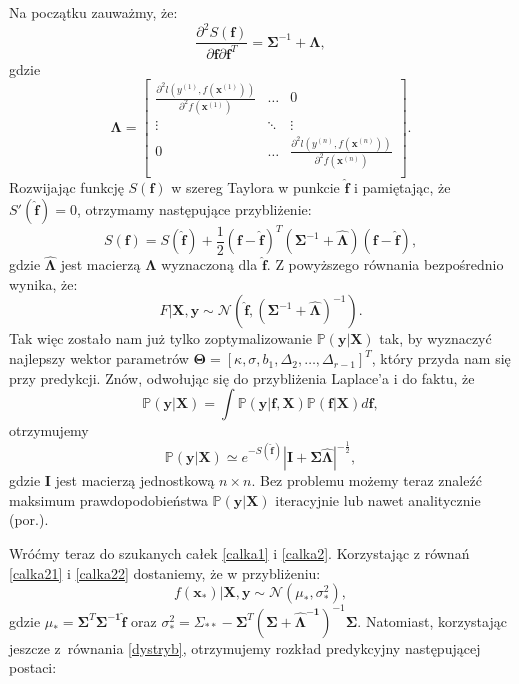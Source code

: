 \documentclass{mini}
\begin{document}
Na początku zauważmy, że:
$$
\frac{\partial^2 S(\mathbf{f})}{\partial \mathbf{f}\partial \mathbf{f}^T} = 
\mathbf{\Sigma}^{-1}+\mathbf{\Lambda},
$$
gdzie
$$
\mathbf{\Lambda} = 
	\left[
        \begin{array}{ccc}
         \frac{\partial^2\textit{l}(y^{(1)}, f(\mathbf{x}^{(1)}))}{\partial^2 f(\mathbf{x}^{(1)})} & \ldots & 0\\
         \vdots & \ddots & \vdots \\
         0 & \ldots & \frac{\partial^2\textit{l}(y^{(n)}, f(\mathbf{x}^{(n)}))}{\partial^2 f(\mathbf{x}^{(n)})} \\
        \end{array}
    \right]. 
$$
Rozwijając funkcję $S(\mathbf{f})$ w szereg Taylora w punkcie $\mathbf{\hat{f}}$ i pamiętając, że $S'(\mathbf{\hat{f}})=0$, otrzymamy następujące przybliżenie:
$$
S(\mathbf{f}) = S(\mathbf{\hat{f}}) + \frac{1}{2}(\mathbf{f} - \mathbf{\hat{f}})^T(\mathbf{\Sigma}^{-1}+\hat{\mathbf{\Lambda}})(\mathbf{f}-\mathbf{\hat{f}}),
$$
gdzie $\hat{\mathbf{\Lambda}}$ jest macierzą $\mathbf{\Lambda}$ wyznaczoną dla $\mathbf{\hat{f}}$. Z powyższego równania bezpośrednio wynika, że:
\begin{equation}\label{calka22}
F | \textbf{X}, \textbf{y} \sim \mathcal{N}\left(  \mathbf{\hat{f}}, (\mathbf{\Sigma}^{-1}+\hat{\mathbf{\Lambda}})^{-1}  \right).
\end{equation}
Tak więc zostało nam już tylko zoptymalizowanie $\mathbb{P}(\mathbf{y} | \textbf{X})$ tak, by wyznaczyć najlepszy wektor parametrów $\mathbf{\Theta} = [\kappa, \sigma, b_1, \Delta_2, \ldots, \Delta_{r-1}]^T$, który przyda nam się przy predykcji. Znów, odwołując się do przybliżenia Laplace'a i do faktu, że
$$
\mathbb{P}(\mathbf{y} | \textbf{X}) = 
\int \mathbb{P}(\mathbf{y}|\mathbf{f}, \textbf{X})\mathbb{P}(\mathbf{f}|\textbf{X}) d\mathbf{f},
$$ 
otrzymujemy
$$
\mathbb{P}(\mathbf{y} | \textbf{X}) \simeq e^{-S(\mathbf{\hat{f}})} \left\vert \mathbf{I} + \mathbf{\Sigma}\mathbf{\hat{\Lambda}} \right\vert^{-\frac{1}{2}},
$$
gdzie $\mathbf{I}$ jest macierzą jednostkową $n\times n$. Bez problemu możemy teraz znaleźć maksimum prawdopodobieństwa $\mathbb{P}(\mathbf{y} | \textbf{X})$ iteracyjnie lub nawet analitycznie (por.\cite{reg}).  

Wróćmy teraz do szukanych całek \eqref{calka1} i \eqref{calka2}. Korzystając z równań \eqref{calka21} i \eqref{calka22} dostaniemy, że w przybliżeniu:
$$
f(\mathbf{x}_{\ast}) | \textbf{X}, \textbf{y} \sim \mathcal{N}(\mu_{\ast}, \sigma_{\ast}^2),
$$
gdzie $\mu_{\ast} = \mathbf{\Sigma}^T \mathbf{\Sigma^{-1}} \mathbf{\hat{f}}$ oraz $\sigma_{\ast}^2 = \Sigma_{\ast\ast}-\mathbf{\Sigma}^T(\mathbf{\Sigma + \mathbf{\hat{\Lambda}}^{-1}})^{-1}\mathbf{\Sigma}$. Natomiast, korzystając jeszcze z~równania \eqref{dystryb}, otrzymujemy rozkład predykcyjny następującej postaci:
\end{document}
